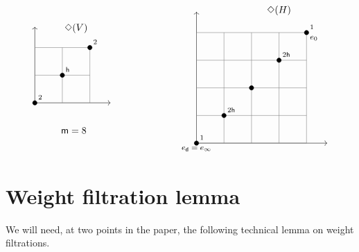 \documentclass[12pt]{amsart}
\numberwithin{equation}{section}
\numberwithin{table}{section}
\newcommand{\hsp}[1]{{\hbox{\hspace{#1}}}}
\def\sfm{\mathsf{m}}
\theoremstyle{definition}
\theoremstyle{definition}
\theoremstyle{remark}
\def\sfd{\mathsf{d}}
\def\sfh{\mathsf{h}}
\begin{document}
%
\begin{equation}\label{E:hd2-5}
\begin{tikzpicture}[baseline={([yshift=-.5ex]current bounding box.center)}]
  \node [above] at (1.5,2.4) {$\Diamond(V)$}; 		%
  \draw [<->] (0,2.75) -- (0,0) -- (2.75,0);		%
  \node [left] at (2,-1) {$\sfm=8$};				%
  \draw [gray] (1,0) -- (1,2);
  \draw [gray] (2,0) -- (2,2);
  \draw [gray] (0,1) -- (2,1);
  \draw [gray] (0,2) -- (2,2);
  \draw [fill] (0,0) circle [radius=0.08];
  \node [above right] at (0,0) {\scriptsize{$2$}};
  \draw [fill] (1,1) circle [radius=0.08];
  \node [above right] at (1,1) {\scriptsize{$\sfh$}};
  \draw [fill] (2,2) circle [radius=0.08];
  \node [above right] at (2,2) {\scriptsize{$2$}};
\end{tikzpicture}
\hsp{70pt}
\begin{tikzpicture}[baseline={([yshift=-.5ex]current bounding box.center)}]
  \node [above] at (1,2.5) {$\Diamond(H)$};			%
  \draw [<->] (-2,2.75) -- (-2,-2) -- (2.75,-2);	%
  \draw [gray] (0,-2) -- (0,2);						%
  \draw [gray] (-2,0) -- (2,0);						%
  \draw [gray] (2,-2) -- (2,2);
  \draw [gray] (1,-2) -- (1,2);
  \draw [gray] (-2,-2) -- (-2,2);
  \draw [gray] (-1,-2) -- (-1,2);
  \draw [gray] (-2,2) -- (2,2);
  \draw [gray] (-2,1) -- (2,1);
  \draw [gray] (-2,-1) -- (2,-1);
  \draw [gray] (-2,-2) -- (2,-2);
  \draw [fill] (-2,-2) circle [radius=0.08];
  \node [above right] at (-2,-2) {\scriptsize{$1$}};
  \node [below] at (-2,-2) {\footnotesize{$e_\sfd=e_\infty$}};
  \draw [fill] (-1,-1) circle [radius=0.08];
  \node [above right] at (-1,-1) {\scriptsize{$2\sfh$}};
  \draw [fill] (0,0) circle [radius=0.08];
  \node [above right] at (0,0) {};
  \draw [fill] (1,1) circle [radius=0.08];
  \node [above right] at (1,1) {\scriptsize{$2\sfh$}};
  \draw [fill] (2,2) circle [radius=0.08];
  \node [above right] at (2,2) {\scriptsize{$1$}};
  \node [below right] at (2,2) {\footnotesize{$e_0$}};
\end{tikzpicture}
\end{equation}


\section{Weight filtration lemma}

We will need, at two points in the paper, the following technical lemma on weight filtrations.
\end{document}
